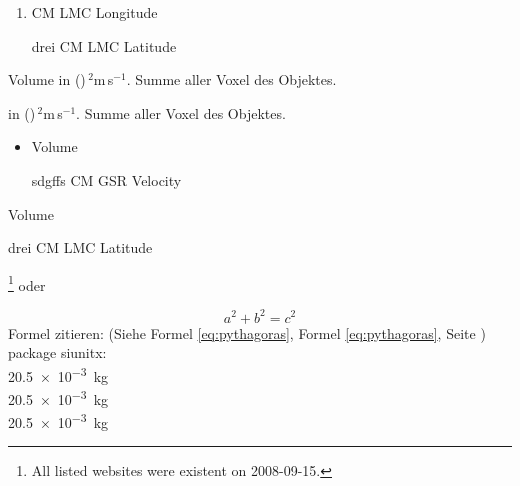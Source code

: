 \begin{enumerate}
	\item CM LMC Longitude
	\item [drei] CM LMC Latitude
\end{enumerate}

\begin{description}
  	\item Volume in (\textdegree)\,$^2$m\,s$^{-1}$. Summe aller Voxel des Objektes.
  	\item [Volume] in (\textdegree)\,$^2$m\,s$^{-1}$. Summe aller Voxel des Objektes.
\end{description}

\begin{itemize}
 	\item Volume
	\item [sdgffs] CM GSR Velocity
\end{itemize}

\begin{list}{asdf}{}
 	\item Volume
	\item [drei] CM LMC Latitude
\end{list}

\footnote{All listed websites were existent on 2008-09-15.} oder \footnotemark {}

\begin{equation}
	a^2 + b^2 = c^2
	\label{eq:pythagoras} 
\end{equation}
Formel zitieren: (Siehe Formel \ref{eq:pythagoras}, Formel \eqref{eq:pythagoras}, Seite \pageref{eq:pythagoras})\\

package siunitx:\\
\SI{20.5e-3}{\kilo\gram}\\
\SI{20.5e-3}{\kg}\\
\SI{20.5e-3}{kg}\\



